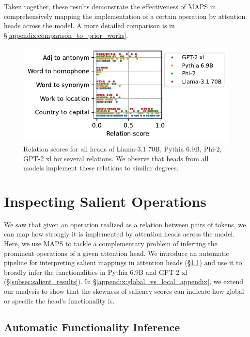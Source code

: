 \documentclass[11pt]{article}
\newcommand{\llamaThreeSeventyB}{Llama-3.1 70B}
\newcommand{\PHI}{Phi-2}
\newcommand{\PythiaSevenB}{Pythia 6.9B}
\newcommand{\GPTxl}{GPT-2 xl}
\newcommand{\framework}{\textsc{MAPS}}
\begin{document}
Taken together, these results demonstrate the effectiveness of \framework{} in comprehensively mapping the implementation of a certain operation by attention heads across the model.
A more detailed comparison is in \S\ref{appendix:comparison_to_prior_works}.


\begin{figure}[t]
\setlength\belowcaptionskip{-8px}
    \centering
    \includegraphics[scale=0.6]{figures/classified_heads/relation_scores_across_models_0.15.pdf}
    \caption{Relation scores for all heads of \llamaThreeSeventyB{}, \PythiaSevenB{}, \PHI{}, \GPTxl{} for several relations. We observe that heads from all models implement these relations to similar degrees.}
    \label{fig:relation_scores_across_models}
\end{figure}




\section{Inspecting Salient Operations}
\label{sec:emergent_relations}

We saw that given an operation realized as a relation between pairs of tokens, we can map how strongly it is implemented by attention heads across the model. Here, we use \framework{} to tackle a complementary problem of inferring the prominent operations of a given attention head. We introduce an automatic pipeline for interpreting salient mappings in attention heads (\S\ref{subsec:automatic_functionality_inf}) and use it to broadly infer the functionalities in \PythiaSevenB{} and \GPTxl{} (\S\ref{subsec:salient_results}). In \S\ref{appendix:global_vs_local_appendix}, we extend our analysis to show that the skewness of saliency scores can indicate how global or specific the head's functionality is.


\subsection{Automatic Functionality Inference}
\label{subsec:automatic_functionality_inf}
\end{document}
